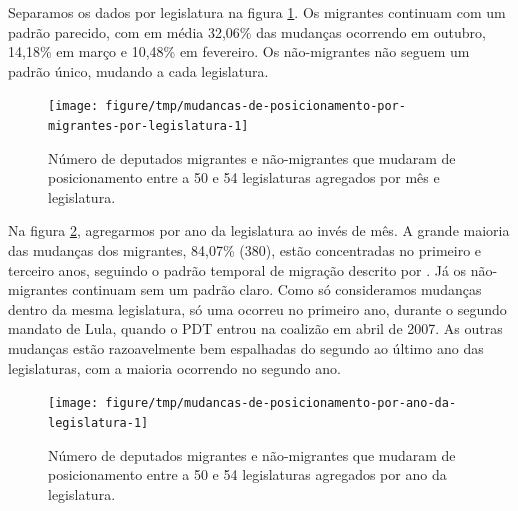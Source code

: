 \documentclass[a4paper,titlepage]{ppgi}\usepackage[]{graphicx}\usepackage[]{color}
\newenvironment{knitrout}{}{} %
\begin{document}
Separamos os dados por legislatura na figura
\ref{fig:mudancas-de-posicionamento-por-migrantes-por-legislatura}. Os
migrantes continuam com um padrão parecido, com em média
32,06\%
das mudanças ocorrendo em outubro,
14,18\%
em março e
10,48\%
em fevereiro. Os não-migrantes não seguem um padrão único, mudando a cada
legislatura.

\begin{knitrout}
\color{fgcolor}\begin{figure}
\texttt{[image: figure/tmp/mudancas-de-posicionamento-por-migrantes-por-legislatura-1]} \caption[Número de deputados migrantes e não-migrantes que mudaram de posicionamento entre a 50\textordfeminine{} e 54\textordfeminine{} legislaturas agregados por mês e legislatura]{Número de deputados migrantes e não-migrantes que mudaram de posicionamento entre a 50\textordfeminine{} e 54\textordfeminine{} legislaturas agregados por mês e legislatura.}\label{fig:mudancas-de-posicionamento-por-migrantes-por-legislatura}
\end{figure}


\end{knitrout}

Na figura \ref{fig:mudancas-de-posicionamento-por-ano-da-legislatura},
agregarmos por ano da legislatura ao invés de mês. A grande maioria das
mudanças dos migrantes,
84,07\%
(380), estão concentradas no
primeiro e terceiro anos, seguindo o padrão temporal de migração descrito por
. Já os não-migrantes continuam sem um padrão claro.
Como só consideramos mudanças dentro da mesma legislatura, só uma ocorreu no
primeiro ano, durante o segundo mandato de Lula, quando o PDT entrou na
coalizão em abril de 2007. As outras mudanças estão razoavelmente bem
espalhadas do segundo ao último ano das legislaturas, com a maioria ocorrendo
no segundo ano.

\begin{knitrout}
\color{fgcolor}\begin{figure}
\texttt{[image: figure/tmp/mudancas-de-posicionamento-por-ano-da-legislatura-1]} \caption[Número de deputados migrantes e não-migrantes que mudaram de posicionamento entre a 50\textordfeminine{} e 54\textordfeminine{} legislaturas agregados por ano da legislatura]{Número de deputados migrantes e não-migrantes que mudaram de posicionamento entre a 50\textordfeminine{} e 54\textordfeminine{} legislaturas agregados por ano da legislatura.}\label{fig:mudancas-de-posicionamento-por-ano-da-legislatura}
\end{figure}


\end{knitrout}
\end{document}
